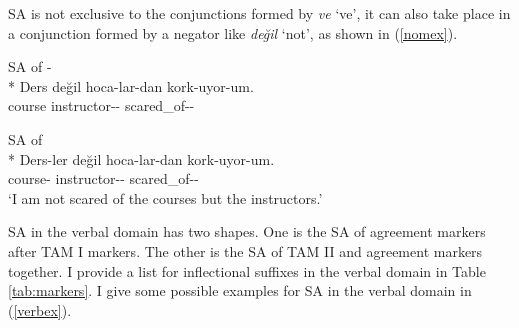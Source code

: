 SA is not exclusive to the conjunctions formed by \textit{ve} `ve', it can also take place in a conjunction formed by a negator like \textit{değil} `not', as shown in (\ref{nomex}).

\begin{exe}
    \ex \label{nomex4}
    \begin{xlist}
        \ex SA of {\Pl-\Abl}\\*
        \gll Ders değil hoca-lar-dan kork-uyor-um. \\ 
        course {\Neg} instructor-{\Pl}-{\Abl} scared\_of-{\Prog}-{\Fsg} \\
        \glt ${}$

        \ex SA of {\Abl}\\*
        \gll Ders-ler değil hoca-lar-dan kork-uyor-um. \\ 
        course-{\Pl} {\Neg} instructor-{\Pl}-{\Abl} scared\_of-{\Prog}-{\Fsg} \\
        \glt `I am not scared of the courses but the instructors.'
    \end{xlist}
\end{exe}

SA in the verbal domain has two shapes. One is the SA of agreement markers after TAM I markers. The other is the SA of TAM II and agreement markers together. I provide a list for inflectional suffixes in the verbal domain in Table \ref{tab:markers}. I give some possible examples for SA in the verbal domain in (\ref{verbex}).


